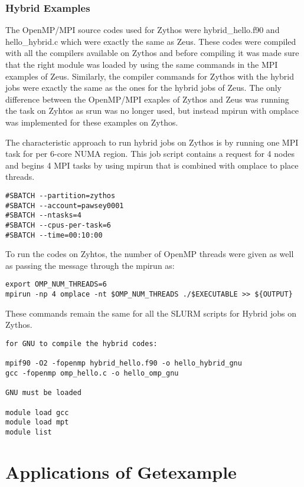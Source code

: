 \documentclass[journal]{IEEEtran}
\begin{document}
\subsubsection{Hybrid Examples}

The OpenMP/MPI source codes used for Zythos were hybrid_hello.f90 and hello_hybrid.c which were exactly the same as Zeus. These codes were compiled with
all the compilers available on Zythos and before compiling it was made sure that the right module was loaded by using the same commands in the MPI 
examples of Zeus. Similarly, the compiler commands for Zythos with the hybrid jobs were exactly the same as the ones for the hybrid jobs of Zeus. The
only difference between the OpenMP/MPI exaples of Zythos and Zeus was running the task on Zyhtos as srun was no longer used, but instead mpirun with 
omplace was implemented for these examples on Zythos. 

The characteristic approach to run hybrid jobs on Zythos is by running one MPI task for per 6-core NUMA region. This job script contains a request for 4
nodes and begins 4 MPI tasks by using mpirun that is combined with omplace to place threads.

\begin{verbatim}
#SBATCH --partition=zythos
#SBATCH --account=pawsey0001
#SBATCH --ntasks=4
#SBATCH --cpus-per-task=6
#SBATCH --time=00:10:00
\end{verbatim}

To run the codes on Zyhtos, the number of OpenMP threads were given as well as passing the message through the mpirun as:

\begin{verbatim}
export OMP_NUM_THREADS=6
mpirun -np 4 omplace -nt $OMP_NUM_THREADS ./$EXECUTABLE >> ${OUTPUT}
\end{verbatim}

These commands remain the same for all the SLURM scripts for Hybrid jobs on Zythos.

\begin{verbatim}
for GNU to compile the hybrid codes:

mpif90 -O2 -fopenmp hybrid_hello.f90 -o hello_hybrid_gnu
gcc -fopenmp omp_hello.c -o hello_omp_gnu

GNU must be loaded
 
module load gcc
module load mpt
module list
\end{verbatim}

\section{Applications of Getexample}
\end{document}
